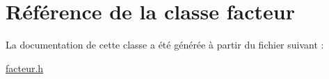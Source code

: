 \hypertarget{classfacteur}{
\section{Référence de la classe facteur}
\label{classfacteur}
}


La documentation de cette classe a été générée à partir du fichier suivant :\begin{DoxyCompactItemize}
\item 
\hyperlink{facteur_8h}{facteur.h}\end{DoxyCompactItemize}
